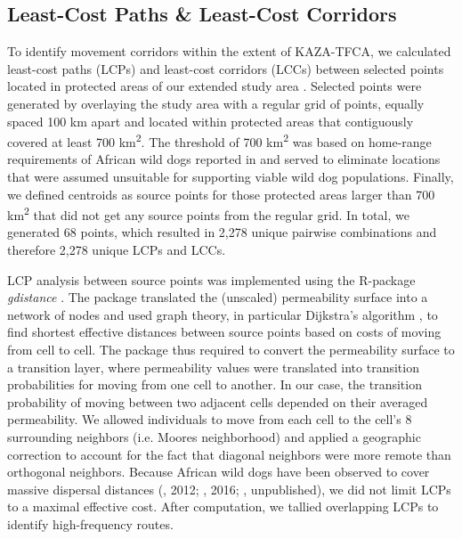 \documentclass[abstract=on,10pt,a4paper,bibliography=totocnumbered]{scrartcl}
\begin{document}
\subsection{Least-Cost Paths \& Least-Cost Corridors}
To identify movement corridors within the extent of KAZA-TFCA, we calculated
least-cost paths (LCPs) and least-cost corridors (LCCs) between selected points
located in protected areas of our extended study area \citep{Adriaensen.2003,
Sawyer.2011}. Selected points were generated by overlaying the study area with a
regular grid of points, equally spaced 100 km apart and located within protected
areas that contiguously covered at least 700 km\textsuperscript{2}. The
threshold of 700 km\textsuperscript{2} was based on home-range requirements of
African wild dogs reported in \cite{Pomilia.2015} and served to eliminate
locations that were assumed unsuitable for supporting viable wild dog
populations. Finally, we defined centroids as source points for those protected
areas larger than 700 km\textsuperscript{2} that did not get any source points
from the regular grid. In total, we generated 68 points, which resulted in 2,278
unique pairwise combinations and therefore 2,278 unique LCPs and LCCs.

LCP analysis between source points was implemented using the R-package
\textit{gdistance} \citep{vanEtten.2018}. The package translated the (unscaled)
permeability surface into a network of nodes and used graph theory, in
particular Dijkstra's algorithm \citep{Dijkstra.1959}, to find shortest
effective distances between source points based on costs of moving from cell to
cell. The package thus required to convert the permeability surface to a
transition layer, where permeability values were translated into transition
probabilities for moving from one cell to another. In our case, the transition
probability of moving between two adjacent cells depended on their averaged
permeability. We allowed individuals to move from each cell to the cell's 8
surrounding neighbors (i.e. Moores neighborhood) and applied a geographic
correction to account for the fact that diagonal neighbors were more remote than
orthogonal neighbors. Because African wild dogs have been observed to cover
massive dispersal distances (\citeauthor{DaviesMostert.2012}, 2012;
\citeauthor{Masenga.2016}, 2016; \citeauthor{Cozzi.2020}, unpublished), we did
not limit LCPs to a maximal effective cost. After computation, we tallied
overlapping LCPs to identify high-frequency routes.
\end{document}
